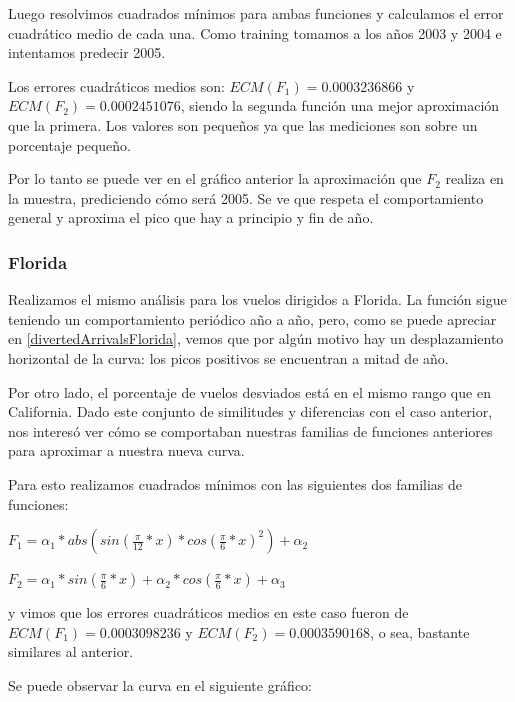 \documentclass{endm}
\begin{document}
Luego resolvimos cuadrados m\'inimos para ambas funciones y calculamos el error cuadr\'atico medio de cada una. Como training tomamos a los a\~nos 2003 y 2004 e intentamos predecir 2005.

Los errores cuadr\'aticos medios son: $ECM(F_1) = 0.0003236866$ y $ECM(F_2) = 0.0002451076$, siendo la segunda funci\'on una mejor aproximaci\'on que la primera. Los valores son peque\~nos ya que las mediciones son sobre un porcentaje peque\~no.

Por lo tanto se puede ver en el gr\'afico anterior la aproximaci\'on que $F_2$ realiza en la muestra, prediciendo c\'omo ser\'a 2005. Se ve que respeta el comportamiento general y aproxima el pico que hay a principio y fin de a\~no.

\subsubsection{Florida}

Realizamos el mismo an\'alisis para los vuelos dirigidos a Florida. La funci\'on sigue teniendo un comportamiento peri\'odico a\~no a a\~no, pero, como se puede apreciar en \ref{divertedArrivalsFlorida}, vemos que por alg\'un motivo hay un desplazamiento horizontal de la curva: los picos positivos se encuentran a mitad de a\~no.

Por otro lado, el porcentaje de vuelos desviados est\'a en el mismo rango que en California.
Dado este conjunto de similitudes y diferencias con el caso anterior, nos interes\'o ver c\'omo se comportaban nuestras familias de funciones anteriores para aproximar a nuestra nueva curva.

Para esto realizamos cuadrados m\'inimos con las siguientes dos familias de funciones:

$F_1 = \alpha_1 * abs(sin(\frac{\pi}{12}*x) * cos(\frac{\pi}{6}*x)^2) + \alpha_2$

$F_2 = \alpha_1 * sin(\frac{\pi}{6}*x) + \alpha_2 * cos(\frac{\pi}{6}*x) + \alpha_3$

y vimos que los errores cuadr\'aticos medios en este caso fueron de $ECM(F_1) = 0.0003098236$ y $ECM(F_2) = 0.0003590168$, o sea, bastante similares al anterior.

Se puede observar la curva en el siguiente gr\'afico:
\end{document}
